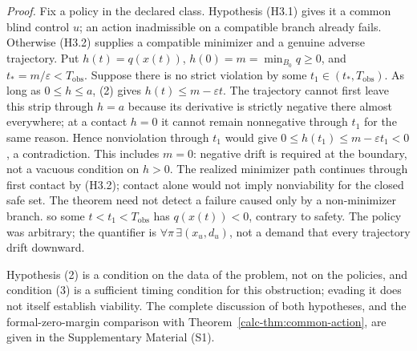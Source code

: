 \documentclass[10pt,twocolumn]{article}
\theoremstyle{definition}
\begin{document}
\emph{Proof.} Fix a policy in the declared class. Hypothesis (H3.1)
gives it a common blind control \(u\); an action inadmissible on a
compatible branch already fails. Otherwise (H3.2) supplies a compatible
minimizer and a genuine adverse trajectory. Put
\(h(t)=q(x(t))\), \(h(0)=m=\min_{B_0}q\ge0\), and
\(t_*=m/\varepsilon<T_{\mathrm{obs}}\). Suppose there is no strict
violation by some \(t_1\in(t_*,T_{\mathrm{obs}})\). As long as
\(0\le h\le a\), (2) gives \(h(t)\le m-\varepsilon t\).
The trajectory cannot first leave this strip through \(h=a\) because
its derivative is strictly negative there almost everywhere; at a
contact \(h=0\) it cannot remain nonnegative through \(t_1\)
for the same reason. Hence nonviolation through \(t_1\) would give
\(0\le h(t_1)\le m-\varepsilon t_1<0\), a contradiction.
This includes \(m=0\): negative drift is required at the boundary,
not a vacuous condition on \(h>0\). The realized minimizer path continues through first contact by (H3.2); contact alone would not imply nonviability for the closed safe set. The theorem need not detect a failure caused only by a non-minimizer branch. so some \(t<t_1<T_{\mathrm{obs}}\) has
\(q(x(t))<0\), contrary to safety. The policy was arbitrary; the
quantifier is \(\forall\pi\,\exists(x_u,d_u)\), not a demand that
every trajectory drift downward.

Hypothesis (2) is a condition on the data of the problem, not on the policies, and condition (3) is a sufficient timing condition for this obstruction; evading it does not itself establish viability. The complete discussion of both hypotheses, and the formal-zero-margin comparison with Theorem~\ref{calc-thm:common-action}, are given in the Supplementary Material (S1).
\end{document}
